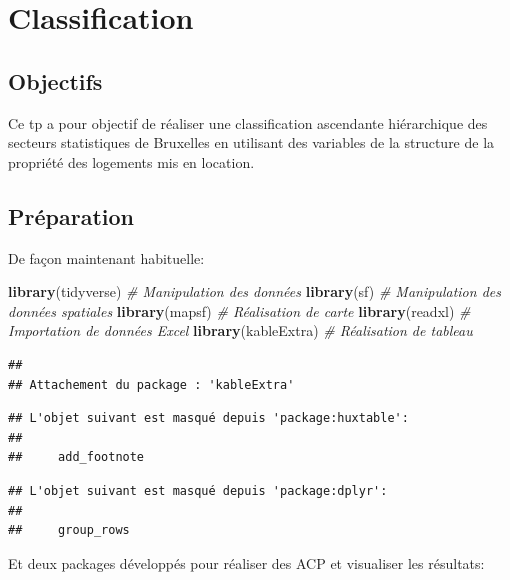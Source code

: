 \documentclass[
]{book}
\newenvironment{Shaded}{\begin{snugshade}}{\end{snugshade}}
\newcommand{\CommentTok}[1]{\textcolor[rgb]{0.56,0.35,0.01}{\textit{#1}}}
\newcommand{\FunctionTok}[1]{\textcolor[rgb]{0.13,0.29,0.53}{\textbf{#1}}}
\newcommand{\NormalTok}[1]{#1}
\begin{document}
\hypertarget{classification}{%
\chapter{Classification}\label{classification}}

\hypertarget{objectifs}{%
\section{Objectifs}\label{objectifs}}

Ce tp a pour objectif de réaliser une classification ascendante hiérarchique des secteurs statistiques de Bruxelles en utilisant des variables de la structure de la propriété des logements mis en location.

\hypertarget{pruxe9paration-1}{%
\section{Préparation}\label{pruxe9paration-1}}

De façon maintenant habituelle:

\begin{Shaded}
\begin{Highlighting}[]
\FunctionTok{library}\NormalTok{(tidyverse) }\CommentTok{\# Manipulation des données }
\FunctionTok{library}\NormalTok{(sf) }\CommentTok{\# Manipulation des données spatiales}
\FunctionTok{library}\NormalTok{(mapsf) }\CommentTok{\# Réalisation de carte}
\FunctionTok{library}\NormalTok{(readxl) }\CommentTok{\# Importation de données Excel}
\FunctionTok{library}\NormalTok{(kableExtra) }\CommentTok{\# Réalisation de tableau }
\end{Highlighting}
\end{Shaded}

\begin{verbatim}
## 
## Attachement du package : 'kableExtra'
\end{verbatim}

\begin{verbatim}
## L'objet suivant est masqué depuis 'package:huxtable':
## 
##     add_footnote
\end{verbatim}

\begin{verbatim}
## L'objet suivant est masqué depuis 'package:dplyr':
## 
##     group_rows
\end{verbatim}

Et deux packages développés pour réaliser des ACP et visualiser les résultats:
\end{document}
